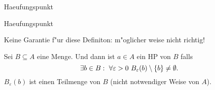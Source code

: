 \documentclass[class=article, crop=false]{standalone}
\begin{document}
\begin{zettel}{Haeufungspunkt}
\begin{flashcard}[kc9twj5w]{Haeufungspunkt}
	\begin{definition}[Haeufungspunkt]
		Keine Garantie f"ur diese Definiton: m"oglicher weise nicht richtig!

		Sei $B \subseteq A$ eine Menge. Und  dann ist $a \in  A$ ein HP von $B$ falls
		\[
			\exists b \in  B : \forall \varepsilon > 0 \ B_{\varepsilon}(b) \setminus \set{b} \neq \emptyset
		.\]
		$B_{\varepsilon}(b)$ ist einen Teilmenge von $B$ (nicht notwendiger Weise von $A$).
	\end{definition}

\end{flashcard}
\end{zettel}
\end{document}
